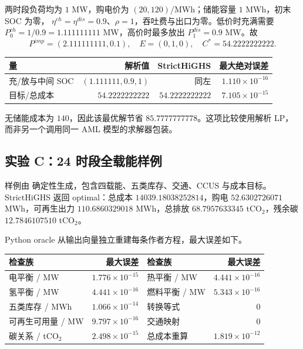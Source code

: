 两时段负荷均为 $1$ MW，购电价为 $(20,120)$/MWh；储能容量 $1$ MWh，初末 SOC 为零，
$\eta^{ch}=\eta^{dis}=0.9$、$\rho=1$，吞吐费与出口为零。低价时充满需要
$P_0^{ch}=1/0.9=1.111111111$ MW，高价时最多放出
$P_1^{dis}=0.9$ MW。故
\begin{equation}
 P^{imp}=(2.111111111,0.1),\quad E=(0,1,0),\quad C^*=54.2222222222.
\end{equation}

\begin{center}\small
\begin{tabular}{@{}lrrr@{}}\toprule
量 & 解析值 & StrictHiGHS & 最大绝对误差\\\midrule
充/放与中间 SOC & $(1.111111,0.9,1)$ & 同左 & $1.110\times10^{-16}$\\
目标/总成本 & $54.2222222222$ & $54.2222222222$ & $7.105\times10^{-15}$\\\bottomrule
\end{tabular}
\end{center}
无储能成本为 $140$，因此该最优解节省 $85.7777777778$。这项比较使用解析 LP，而非另一个调用同一 AML
模型的求解器包装。

\subsection{实验 C：24 时段全载能样例}

样例由 
确定性生成，包含四载能、五类库存、交通、CCUS 与成本目标。StrictHiGHS 返回 optimal：总成本
$14039.18038252814$，购电 $52.6302726071$ MWh，可再生出力 $110.6860329018$ MWh，总排放
$68.7957633345$ tCO$_2$，残余碳 $12.7846107510$ tCO$_2$。

Python oracle 从输出向量独立重建每条作者方程，最大误差如下。
\begin{center}\small
\begin{tabular}{@{}lrlr@{}}\toprule
检查族 & 最大误差 & 检查族 & 最大误差\\\midrule
电平衡 / MW & $1.776\times10^{-15}$ & 热平衡 / MW & $4.441\times10^{-16}$\\
氢平衡 / MW & $4.441\times10^{-16}$ & 燃料平衡 / MW & $5.343\times10^{-16}$\\
五类库存 / MWh & $1.066\times10^{-14}$ & 转换等式 & $0$\\
可再生可用量 / MW & $9.797\times10^{-16}$ & 交通映射 & $0$\\
碳关系 / tCO$_2$ & $2.498\times10^{-15}$ & 总成本重算 & $1.819\times10^{-12}$\\\bottomrule
\end{tabular}
\end{center}

